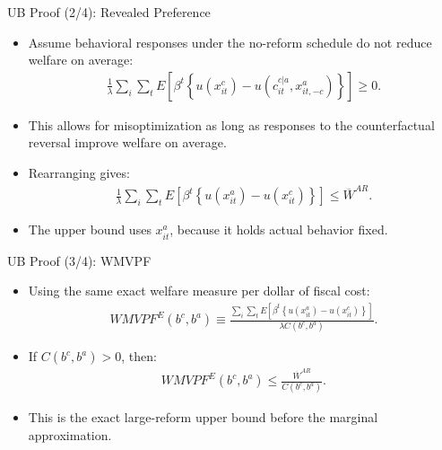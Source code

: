 \begin{frame}[label=ubProofRP]{UB Proof (2/4): Revealed Preference}
    \small
    \begin{itemize}
        \item Assume behavioral responses under the no-reform schedule do not reduce welfare on average:
        \begin{align*}
            \frac{1}{\lambda}\sum_i\sum_t E\left[
            \beta^t
            \left\{
            u(x^c_{it})-u(c^{c|a}_{it},x^a_{it,-c})
            \right\}
            \right]
            \ge 0.
        \end{align*}
        \item This allows for misoptimization as long as responses to the counterfactual reversal improve welfare on average.
        \item Rearranging gives:
        \begin{align*}
            \frac{1}{\lambda}\sum_i\sum_t E\left[
            \beta^t
            \left\{
            u(x^a_{it})-u(x^c_{it})
            \right\}
            \right]
            \le
            \overline W^{AR}.
        \end{align*}
        \item The upper bound uses \(x^a_{it}\), because it holds actual behavior fixed.
    \end{itemize}
\end{frame}

\begin{frame}[label=ubProofWMVPF]{UB Proof (3/4): WMVPF}
    \small
    \begin{itemize}
        \item Using the same exact welfare measure per dollar of fiscal cost:
        \begin{align*}
            WMVPF^E(b^c,b^a)
            \equiv
            \frac{\sum_i\sum_t E\left[
            \beta^t
            \left\{
            u(x^a_{it})-u(x^c_{it})
            \right\}
            \right]}{\lambda C(b^c,b^a)}.
        \end{align*}
        \item If \(C(b^c,b^a)>0\), then:
        \begin{align*}
            WMVPF^E(b^c,b^a)
            \le
            \frac{\overline W^{AR}}{C(b^c,b^a)}.
        \end{align*}
        \item This is the exact large-reform upper bound before the marginal approximation.
    \end{itemize}
\end{frame}

